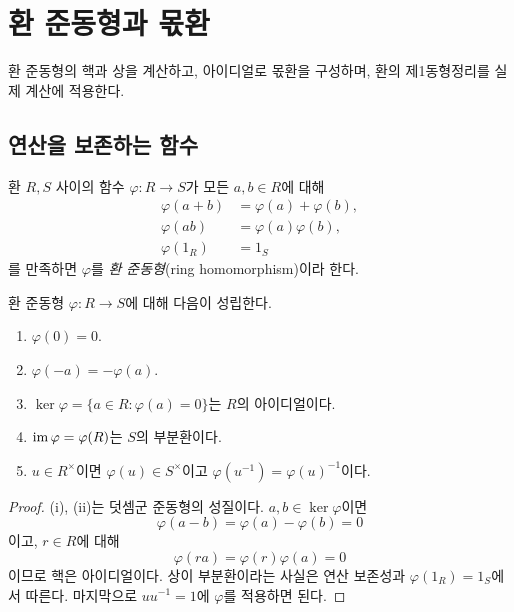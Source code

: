 \section{환 준동형과 몫환}
\label{sec:ring-homomorphisms-quotients}

\begin{learninggoal}
환 준동형의 핵과 상을 계산하고, 아이디얼로 몫환을 구성하며, 환의 제1동형정리를 실제 계산에 적용한다.
\end{learninggoal}

\subsection{연산을 보존하는 함수}

\begin{definition}[환 준동형]
환 $R,S$ 사이의 함수 $\varphi:R\to S$가 모든 $a,b\in R$에 대해
\[
\begin{aligned}
 \varphi(a+b)&=\varphi(a)+\varphi(b),\\
 \varphi(ab)&=\varphi(a)\varphi(b),\\
 \varphi(1_R)&=1_S
\end{aligned}
\]
를 만족하면 $\varphi$를 \emph{환 준동형}(ring homomorphism)이라 한다.
\end{definition}

\begin{proposition}
환 준동형 $\varphi:R\to S$에 대해 다음이 성립한다.
\begin{enumerate}[label=(\roman*)]
  \item $\varphi(0)=0$.
  \item $\varphi(-a)=-\varphi(a)$.
  \item $\ker\varphi=\{a\in R:\varphi(a)=0\}$는 $R$의 아이디얼이다.
  \item $\operatorname{im}\varphi=\varphi(R)$는 $S$의 부분환이다.
  \item $u\in R^\times$이면 $\varphi(u)\in S^\times$이고 $\varphi(u^{-1})=\varphi(u)^{-1}$이다.
\end{enumerate}
\end{proposition}

\begin{proof}
(i), (ii)는 덧셈군 준동형의 성질이다. $a,b\in\ker\varphi$이면
\[
  \varphi(a-b)=\varphi(a)-\varphi(b)=0
\]
이고, $r\in R$에 대해
\[
  \varphi(ra)=\varphi(r)\varphi(a)=0
\]
이므로 핵은 아이디얼이다. 상이 부분환이라는 사실은 연산 보존성과 $\varphi(1_R)=1_S$에서 따른다. 마지막으로 $uu^{-1}=1$에 $\varphi$를 적용하면 된다.
\end{proof}

